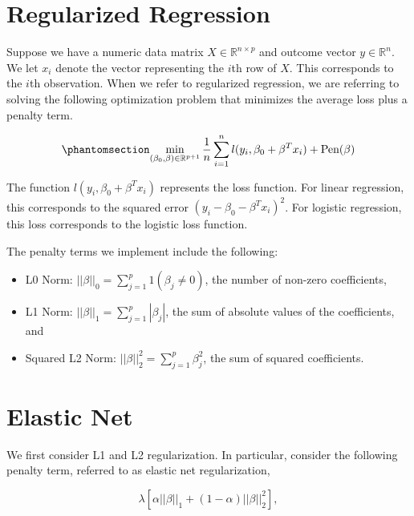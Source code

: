 \documentclass[
  letterpaper,
]{latex/krantz}
\begin{document}
\section{Regularized Regression}\label{regularized-regression}

Suppose we have a numeric data matrix \(X \in \mathbb{R}^{n \times p}\)
and outcome vector \(y \in \mathbb{R}^n\). We let \(x_i\) denote the
vector representing the \(i\)th row of \(X\). This corresponds to the
\(i\)th observation. When we refer to regularized regression, we are
referring to solving the following optimization problem that minimizes
the average loss plus a penalty term.

\begin{equation}\phantomsection\label{eq-reguarlization}{ 
\min_{ (\beta_0, \beta) \in \mathbb{R}^{p+1}} \frac{1}{n} \sum_{i=1}^n l(y_i, \beta_0 + \beta^T x_i) + \text{Pen}(\beta)
}\end{equation}

The function \(l(y_i, \beta_0 + \beta^T x_i)\) represents the loss
function. For linear regression, this corresponds
to the squared error \((y_i - \beta_0 - \beta^T x_i)^2\). For logistic
regression, this loss corresponds to the logistic loss function.

The penalty terms  we
implement include the following:

\begin{itemize}
\item
  L0 Norm: \(||\beta ||_0 = \sum_{j=1}^p 1(\beta_j \neq 0)\), the number
  of non-zero coefficients,
\item
  L1 Norm: \(||\beta ||_1 = \sum_{j=1}^p |\beta_j|\), the sum of
  absolute values of the coefficients, and
\item
  Squared L2 Norm: \(||\beta ||_2^2 = \sum_{j=1}^p \beta_j^2\), the sum
  of squared coefficients.
\end{itemize}

\section{\texorpdfstring{Elastic Net
}{Elastic Net }}\label{elastic-net}

We first consider L1 and L2 regularization. In particular, consider the
following penalty term, referred to as elastic net regularization,

\[ 
\lambda \left[ \alpha ||\beta||_1 + (1-\alpha) ||\beta||^2_2 \right],
\]
\end{document}
